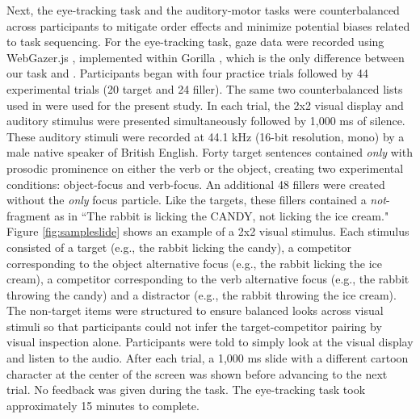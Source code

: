 Next, the eye-tracking task and the auditory-motor tasks were counterbalanced across participants to mitigate order effects and minimize potential biases related to task sequencing. For the eye-tracking task, gaze data were recorded using WebGazer.js \parencite{Papoutsaki}, implemented within Gorilla \parencite{Anwyl-Irvine_2019}, which is the only difference between our task and \cite{ge2021a}. Participants began with four practice trials followed by 44 experimental trials (20 target and 24 filler). The same two counterbalanced lists used in \cite{ge2021a} were used for the present study. In each trial, the 2x2 visual display and auditory stimulus were presented simultaneously followed by 1,000 ms of silence. These auditory stimuli were recorded at 44.1 kHz (16-bit resolution, mono) by a male native speaker of British English. Forty target sentences contained \textit{only} with prosodic prominence on either the verb or the object, creating two experimental conditions: object-focus and verb-focus. An additional 48 fillers were created without the \textit{only} focus particle. Like the targets, these fillers contained a \textit{not}-fragment as in ``The rabbit is licking the CANDY, not licking the ice cream." Figure \ref{fig:sampleslide} shows an example of a 2x2 visual stimulus. Each stimulus consisted of a target (e.g., the rabbit licking the candy), a competitor corresponding to the object alternative focus (e.g., the rabbit licking the ice cream), a competitor corresponding to the verb alternative focus (e.g., the rabbit throwing the candy) and a distractor (e.g., the rabbit throwing the ice cream). The non-target items were structured to ensure balanced looks across visual stimuli so that participants could not infer the target-competitor pairing by visual inspection alone. Participants were told to simply look at the visual display and listen to the audio. After each trial, a 1,000 ms slide with a different cartoon character at the center of the screen was shown before advancing to the next trial. No feedback was given during the task. The eye-tracking task took approximately 15 minutes to complete.

